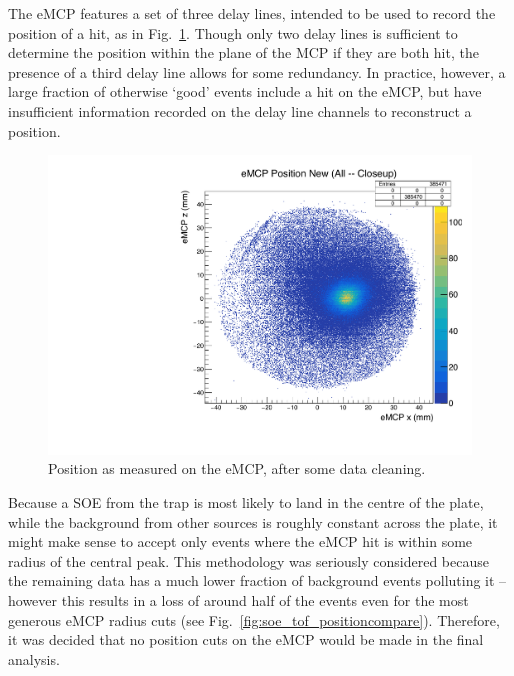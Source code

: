 The eMCP features a set of three delay lines, intended to be used to record the position of a hit, as in Fig.~\ref{fig:emcp_position}.    Though only two delay lines is sufficient to determine the position within the plane of the MCP if they are both hit, the presence of a third delay line allows for some redundancy.  In practice, however, a large fraction of otherwise `good' events include a hit on the eMCP, but have insufficient information recorded on the delay line channels to reconstruct a position.  

\begin{figure}[h!!!!t!]
	\centering
	\includegraphics[width=.999\linewidth]
	{Figures/eMCP_position.pdf}
	\caption{Position as measured on the eMCP, after some data cleaning.}	
	\label{fig:emcp_position}
\end{figure}

Because a SOE from the trap is most likely to land in the centre of the plate, while the background from other sources is roughly constant across the plate,  it might make sense to accept only events where the eMCP hit is within some radius of the central peak.  This methodology was seriously considered because the remaining data has a much lower fraction of background events polluting it -- however this results in a loss of around half of the events even for the most generous eMCP radius cuts (see Fig.~\ref{fig:soe_tof_positioncompare}).  Therefore, it was decided that no position cuts on the eMCP would be made in the final analysis.

